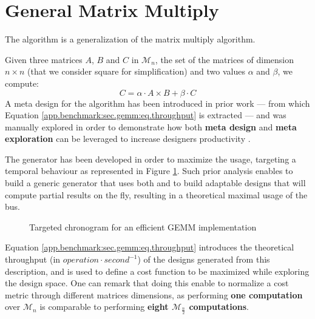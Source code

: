     \clearpage
    \section*{General Matrix Multiply}
\vspace{-0.2cm}
        The  algorithm is a generalization of the matrix multiply algorithm.

        Given three matrices $A$, $B$ and $C$ in $\mathcal{M}_n$, the set of the matrices of dimension $n \times n$ (that we consider square for simplification) and two values $\alpha$ and $\beta$, we compute:
        \begin{equation}
            \label{app.benchmark:sec.gemm:eq.formula}
            C = \alpha \cdot A \times B + \beta \cdot C
        \end{equation}
        A meta design for the  algorithm has been introduced in prior work \cite{ferres2020chisel} --- from which Equation \ref{app.benchmark:sec.gemm:eq.throughput} is extracted --- and was manually explored in order to demonstrate how both {\bf meta design} and {\bf meta exploration} can be leveraged to increase designers productivity \cite{ferres_2021_integrating}.

        The  generator has been developed in order to maximize the  usage, targeting a temporal behaviour as represented in Figure \ref{app.benchmark:fig.gemm-chrono}.
        Such prior analysis enables to build a generic generator that uses both  and  to build adaptable designs that will compute partial results on the fly, resulting in a theoretical maximal usage of the bus.

        \begin{figure}[h!]
            \center

            \caption{Targeted chronogram for an efficient GEMM implementation}
            \label{app.benchmark:fig.gemm-chrono}
        \end{figure}
\vspace{-0.3cm}
        Equation \ref{app.benchmark:sec.gemm:eq.throughput} introduces the theoretical throughput (in $operation\cdot second^{-1}$) of the designs generated from this description, and is used to define a cost function to be maximized while exploring the  design space.
        One can remark that doing this enable to normalize a cost metric through different matrices dimensions, as performing {\bf one  computation} over $\mathcal{M}_n$ is comparable to performing {\bf eight $\mathcal{M}_{\frac{n}{2}}$ computations}.

